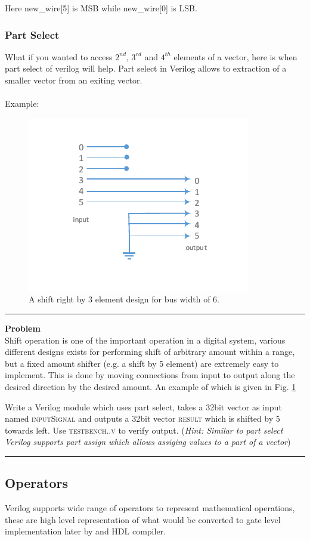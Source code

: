 \documentclass[a4paper,10pt]{article}
\newcommand{\ano}{\text{1}}
\theoremstyle{mytheor}
\newcommand{
  \insertverilog}[3]{
  
}
\newcounter{problemNumber}
\newcommand {
  \insertProblem}[1]{
  \vspace{0.5cm}
  \hrule
  \vspace{0.3cm}

  {\color{greatblue}\textbf{\large{Problem \theproblemNumber}}}
  \vspace{2pt}\\#1

  \addtocounter{problemNumber}{1}
  \vspace{0.2cm}
  \hrule  
  \vspace{0.5cm}
}
\begin{document}
Here new\_wire[{\color{orange}5}] is MSB while new\_wire[{\color{orange}0}] is LSB.

\subsubsection*{Part Select}
What if you wanted to access $2^{nd}$, $3^{rd}$ and $4^{th}$ elements of a vector, here is when part select of verilog will help. Part select in Verilog allows to extraction of a smaller vector from an exiting vector.\\ 
\vspace{0.2cm}\\
Example:
\insertverilog{./verilog_files/bitExtract.v}{bit-extract}{\text{Using bit extract to extract lower, higher and middle 16 bits from a 32 bit input}}

\begin{figure}[!h] \centering  
  \includegraphics[width=0.45\linewidth]{./resources/shiftUsingWires_representation.pdf}
  \caption{A shift right by 3 element design for bus width of 6.} 
  \label{Fig:shiftUsingWires-representation}
\end{figure}
\insertProblem{ Shift operation is one of the important operation in a digital system, various different designs exists for performing shift of arbitrary amount within a range, but a fixed amount shifter (e.g. a shift by 5 element) are extremely easy to implement. This is done by moving connections from input to output along the desired direction by the desired amount. An example of which is given in Fig. \ref{Fig:shiftUsingWires-representation} 

  Write a Verilog module which uses part select, takes a 32bit vector as input named \textsc{inputSignal} and outputs a 32bit vector \textsc{result} which is shifted by 5 towards left. Use \textsc{testbench{\ano}.{\theproblemNumber}.v} to verify output. (\textit{Hint: Similar to part select Verilog supports part assign which allows assiging values to a part of a vector})}
%

\subsection*{Operators}
Verilog supports wide range of operators to represent mathematical operations, these are high level representation of what would be converted to gate level implementation later by and HDL compiler.
\end{document}
